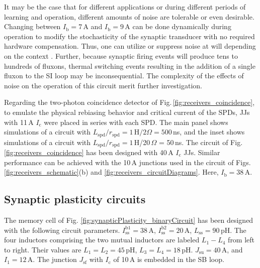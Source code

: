 \documentclass[aip,amsmath,amssymb,reprint,nofootinbib]{revtex4-1}
\begin{document}
It may be the case that for different applications or during different periods of learning and operation, different amounts of noise are tolerable or even desirable. Changing between $I_{\mathrm{b}} = 7$\,\textmu A and $I_{\mathrm{b}} = 9$\,\textmu A can be done dynamically during operation to modify the stochasticity of the synaptic transducer with no required hardware compensation. Thus, one can utilize or suppress noise at will depending on the context \cite{vrso1996,vora2005,stgo2005}. Further, because synaptic firing events will produce tens to hundreds of fluxons, thermal switching events resulting in the addition of a single fluxon to the SI loop may be inconsequential. The complexity of the effects of noise on the operation of this circuit merit further investigation.

Regarding the two-photon coincidence detector of Fig.\,\ref{fig:receivers_coincidence}, to emulate the physical rebiasing behavior and critical current of the SPDs, JJs with 11\,\textmu A $I_{\mathrm{c}}$ were placed in series with each SPD. The main panel shows simulations of a circuit with $L_{\mathrm{spd}}/r_{\mathrm{spd}} = 1$\,\textmu H$/2\Omega = 500$\,ns, and the inset shows simulations of a circuit with $L_{\mathrm{spd}}/r_{\mathrm{spd}} = 1$\,\textmu H/20\,$\Omega$ = 50\,ns. The circuit of Fig.\,\ref{fig:receivers_coincidence} has been designed with 40\,\textmu A $I_{\mathrm{c}}$ JJs. Similar performance can be achieved with the 10\,\textmu A junctions used in the circuit of Figs.\,\ref{fig:receivers_schematic}(b) and \ref{fig:receivers_circuitDiagrams}. Here, $I_{\mathrm{b}} = 38$\,\textmu A. 

\subsection{Synaptic plasticity circuits}
The memory cell of Fig. \ref{fig:synapticPlasticity_binaryCircuit} has been designed with the following circuit parameters. $I_{\mathrm{ss}}^{\mathrm{b1}} = 38$\,\textmu A, $I_{\mathrm{ss}}^{\mathrm{b2}} = 20$\,\textmu A, $L_{\mathrm{ss}} = 90$\,pH. The four inductors comprising the two mutual inductors are labeled $L_1-L_4$ from left to right. Their values are $L_1=L_2=45$\,pH, $L_3=L_4=18$\,pH. $J_{\mathrm{su}} = 40$\,\textmu A, and $I_1 = 12$\,\textmu A. The junction $J_{\mathrm{sf}}$ with $I_{\mathrm{c}}$ of 10\,\textmu A is embedded in the SB loop. 
\end{document}
